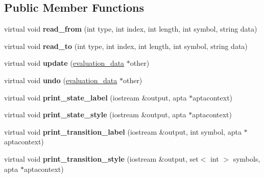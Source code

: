 \subsection*{Public Member Functions}
\begin{DoxyCompactItemize}
\item 
virtual void {\bfseries read\+\_\+from} (int type, int index, int length, int symbol, string data)\hypertarget{classevaluation__data_ad4774370fe02a3daadfe4b2aed447ac5}{}\label{classevaluation__data_ad4774370fe02a3daadfe4b2aed447ac5}

\item 
virtual void {\bfseries read\+\_\+to} (int type, int index, int length, int symbol, string data)\hypertarget{classevaluation__data_aff5dc3181ecf1391840b9193715dc229}{}\label{classevaluation__data_aff5dc3181ecf1391840b9193715dc229}

\item 
virtual void {\bfseries update} (\hyperlink{classevaluation__data}{evaluation\+\_\+data} $\ast$other)\hypertarget{classevaluation__data_a863d6fd9eb36651639f0879af3262d5c}{}\label{classevaluation__data_a863d6fd9eb36651639f0879af3262d5c}

\item 
virtual void {\bfseries undo} (\hyperlink{classevaluation__data}{evaluation\+\_\+data} $\ast$other)\hypertarget{classevaluation__data_a14974d8526bdfbf7a05a4d2f53378b0e}{}\label{classevaluation__data_a14974d8526bdfbf7a05a4d2f53378b0e}

\item 
virtual void {\bfseries print\+\_\+state\+\_\+label} (iostream \&output, apta $\ast$aptacontext)\hypertarget{classevaluation__data_a42ec54d6111c2dc9979b679c714e03f3}{}\label{classevaluation__data_a42ec54d6111c2dc9979b679c714e03f3}

\item 
virtual void {\bfseries print\+\_\+state\+\_\+style} (iostream \&output, apta $\ast$aptacontext)\hypertarget{classevaluation__data_a6cb73abd19dc438a0060fc675486703f}{}\label{classevaluation__data_a6cb73abd19dc438a0060fc675486703f}

\item 
virtual void {\bfseries print\+\_\+transition\+\_\+label} (iostream \&output, int symbol, apta $\ast$aptacontext)\hypertarget{classevaluation__data_a42616b2b65dcce18c38db0198c0c6357}{}\label{classevaluation__data_a42616b2b65dcce18c38db0198c0c6357}

\item 
virtual void {\bfseries print\+\_\+transition\+\_\+style} (iostream \&output, set$<$ int $>$ symbols, apta $\ast$aptacontext)\hypertarget{classevaluation__data_addc2c82524a7056090084c65560e13ab}{}\label{classevaluation__data_addc2c82524a7056090084c65560e13ab}


\end{DoxyCompactItemize}
